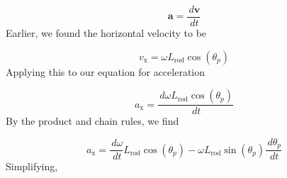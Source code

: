 \documentclass[12pt]{article}
\begin{document}
\begin{displaymath}
\symbf{a}=\frac{\,d\symbf{v}}{\,dt}
\end{displaymath}
Earlier, we found the horizontal velocity to be

\begin{displaymath}
{v_{\text{x}}}=ω {L_{\text{rod}}} \cos\left({θ_{p}}\right)
\end{displaymath}
Applying this to our equation for acceleration

\begin{displaymath}
{a_{\text{x}}}=\frac{\,dω {L_{\text{rod}}} \cos\left({θ_{p}}\right)}{\,dt}
\end{displaymath}
By the product and chain rules, we find

\begin{displaymath}
{a_{\text{x}}}=\frac{\,dω}{\,dt} {L_{\text{rod}}} \cos\left({θ_{p}}\right)-ω {L_{\text{rod}}} \sin\left({θ_{p}}\right) \frac{\,d{θ_{p}}}{\,dt}
\end{displaymath}
Simplifying,
\end{document}
